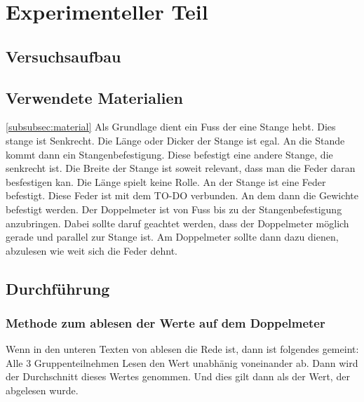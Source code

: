 \documentclass[../main.tex]{subfiles} %
\begin{document}
\section{Experimenteller Teil}\label{sec:experimenteller-teil}
    \subsection{Versuchsaufbau}\label{subsec:versuchsaufbau}

    \subsection{Verwendete Materialien}\ref{subsubsec:material}\label{zu der Materialliste}
        Als Grundlage dient ein Fuss der eine Stange hebt. Dies stange ist Senkrecht.
        Die Länge oder Dicker der Stange ist egal. An die Stande kommt dann ein Stangenbefestigung.
        Diese befestigt eine andere Stange, die senkrecht ist.
        Die Breite der Stange ist soweit relevant, dass man die Feder daran besfestigen kan. Die Länge spielt keine Rolle.
        An der Stange ist eine Feder befestigt. Diese Feder ist mit dem TO-DO verbunden.
        An dem dann die Gewichte befestigt werden.
        Der Doppelmeter ist von Fuss bis zu der Stangenbefestigung anzubringen. Dabei sollte daruf geachtet werden, dass der Doppelmeter möglich gerade und parallel zur Stange ist.
        Am Doppelmeter sollte dann dazu dienen, abzulesen wie weit sich die Feder dehnt.

        \subsection{Durchführung}\label{subsec:durchfuhrung}

        \subsubsection{Methode zum ablesen der Werte auf dem Doppelmeter}\label{subsubsec:methode-zum-ablesen-der-werte-auf-dem-doppelmeter}

        Wenn in den unteren Texten von ablesen die Rede ist, dann ist folgendes gemeint:
        Alle 3 Gruppenteilnehmen Lesen den Wert unabhänig voneinander ab. Dann wird der Durchschnitt dieses Wertes genommen. Und dies gilt dann als der Wert, der abgelesen wurde.
\end{document}
